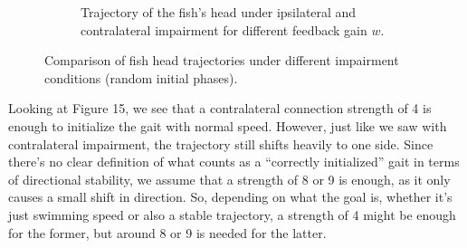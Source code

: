 \documentclass{cmc}
\begin{document}
\begin{figure}[H]
\begin{subfigure}[t]{0.48\linewidth}
        \caption{Trajectory of the fish's head under ipsilateral and contralateral impairment for different feedback gain $w$.}
        \label{fig:contra_ipsi_cutoff}
    \end{subfigure}
    \caption{Comparison of fish head trajectories under different impairment conditions (random initial phases).}
    
\end{figure}

Looking at Figure 15, we see that a contralateral connection strength of 4 is enough to initialize the gait with normal speed. However, just like we saw with contralateral impairment, the trajectory still shifts heavily to one side. Since there’s no clear definition of what counts as a “correctly initialized” gait in terms of directional stability, we assume that a strength of 8 or 9 is enough, as it only causes a small shift in direction. So, depending on what the goal is, whether it’s just swimming speed or also a stable trajectory, a strength of 4 might be enough for the former, but around 8 or 9 is needed for the latter.
\end{document}
